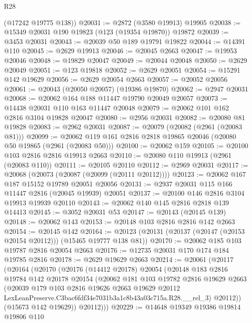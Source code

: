 \begin{lexlean}{R28}
\begin{coremodule}
      (@17242 @19775 @138))
@20031 := @2872 (@3580 @19913) @19905
@20038 := @15349 @20031 @190 @19823 (@123 (@19354 @19870)) @19872
@20039 := @3453 @20031
@20043 := @20039 @50 @189 @19791 @19822
@20044 := @14391 @110
@20045 := @2629 @19913
@20046 := @20045 @2663
@20047 := @19953 @20046
@20048 := @19829 @20047
@20049 := @20044 @20048
@20050 := @2629 @20049
@20051 := @123 @19818
@20052 := @2629 @20051
@20054 := @15291 @142 @19629
@20056 := @2629 @20054 @2663
@20057 := @20052 @20056
@20061 := @20043 (@20050 @20057) (@19386 @19870)
@20062 := @2947 @20031
@20068 := @20062 @164 @188 @11447 @19790 @20049 @20057
@20073 := @14438 @20031 @110 @163 @11447 @20048
@20079 := @20062 @101 @162 @2816 @3104 @19828 @20047
@20080 := @2956 @20031
@20082 := @20080 @81 @19828
@20083 := @2962 @20031
@20087 := @20079 (@20082 (@2961 (@20083 @81)))
@20099 := @20062 @119 @161 @2816 @2818 @19865 @20046 (@20080 @50 @19865 (@2961 (@20083 @50)))
@20100 := @20062 @159
@20105 := @20100 @103 @2816 @2816 @19913 @2663
@20110 := @20080 @110 @19913 (@2961 (@20083 @110))
@20111 := @20105 @20110
@20112 := @2969 @20031
@20117 := @20068 (@20073 (@20087 (@20099 (@20111 @20112))))
@20123 := @20062 @167 @187 @15152 @19789 @20051 @20056
@20131 := @2937 @20031 @115 @166 @11447 @2816 (@20045 @19939) @20051
@20137 := @20100 @146 @2816 @3104 @19913 @19939 @20110
@20143 := @20062 @140 @145 @2816 @2818 @139 @14413
@20145 := @3052 @20031 @53
@20147 := @20143 (@20145 @139)
@20148 := @20062 @143
@20153 := @20148 @103 @2816 @2816 @142 @2663
@20154 := @20145 @142
@20164 := @20123 (@20131 (@20137 (@20147 (@20153 @20154 @20112))) (@15465 @19777 @138 @81))
@20170 := @20062 @185 @103 @19787 @2816 @20054 @2663
@20176 := @12735 @20031 @170 @174 @184 @19785 @2816
@20178 := @2629 @19629 @2663
@20214 := @20061
    (@20117
      (@20164
        (@20170
          (@20176
            (@14412 @20178)
            @20054
            (@20148
              @183
              @2816
              @19784
              @142
              @20178
              @20154
              (@20062
                @181
                @103
                @19782
                @2816
                @19629
                @2663
                (@20039
                  @179
                  @103
                  @2816
                  @19626
                  @2663
                  @19629
                  @20112
                  LexLeanPreserve.C3bac6fdf34e7031b3a1c8b43a03c715a.R28.__rel_3)
                @20112))
            (@15673 @142 @19629))
          @20112)))
@20229 := @14648
    @19349
    @19386
    @19814
    @19806
    @110

\end{coremodule}
\end{lexlean}
